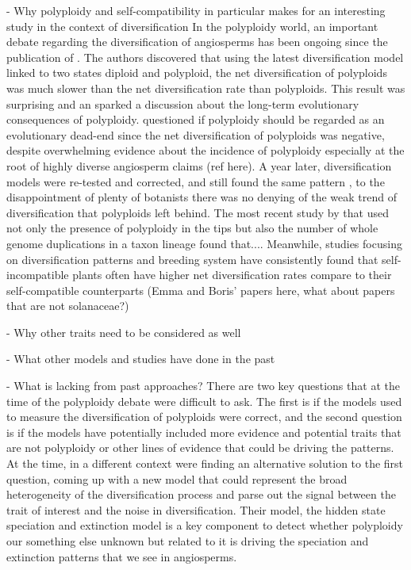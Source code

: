 - Why polyploidy and self-compatibility in particular makes for an  interesting study in the context of diversification\newline
In the polyploidy world, an important debate regarding the diversification of angiosperms has been ongoing since the publication of \citet{mayrose_2011}. The authors discovered that using the latest diversification model linked to two states diploid and polyploid, the net diversification of polyploids was much slower than the net diversification rate than polyploids. This result was surprising and an sparked a discussion about the long-term evolutionary consequences of polyploidy. \citet{soltis_2014} questioned if polyploidy should be regarded as an evolutionary dead-end since the net diversification of polyploids was negative, despite overwhelming evidence about the incidence of polyploidy  especially at the root of highly diverse angiosperm claims (ref here). A year later, diversification models were re-tested and corrected, and still found the same pattern \citep{mayrose_2015}, to the disappointment of plenty of botanists there was no denying of the weak trend of diversification that polyploids left behind. The most recent study by \citet{landis_2018} that used not only the presence of polyploidy in the tips but also the number of whole genome duplications in a taxon lineage found that.... \newline  Meanwhile, studies focusing on diversification patterns and  breeding system have consistently found that self-incompatible plants often have higher net diversification rates compare to their self-compatible counterparts (Emma and Boris' papers here, what about papers that are not solanaceae?) 

- Why other traits need to be considered as well\newline


- What other models and studies have done in the past\newline

- What is lacking from past approaches? \newline
There are two key questions that at the time of the polyploidy debate were difficult to ask. The first is if the models used to measure the diversification of polyploids were correct, and the second question is if the models have potentially included more evidence and potential traits that are not polyploidy or other lines of evidence that could be driving the patterns. At the time, in a different context \citet{beaulieu_2016} were finding an alternative solution to the first question, coming up with a new model that could represent the broad heterogeneity of the diversification process and parse out the signal between the trait of interest and the noise in diversification. Their model, the hidden state speciation and extinction model is a key component to detect whether polyploidy our something else unknown but related to it is driving the speciation and extinction patterns that we see in angiosperms. \newline

